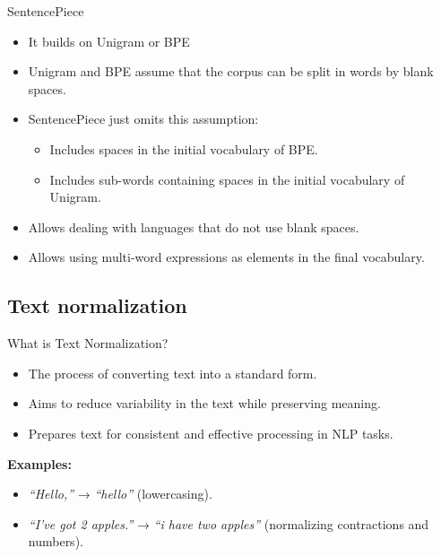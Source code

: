 \documentclass{beamer}
\begin{document}
\begin{frame}{SentencePiece}
    \begin{itemize}
      \item It builds on Unigram or BPE
      \item Unigram and BPE assume that the corpus can be split in words by blank spaces.
      \item SentencePiece just omits this assumption:
      \begin{itemize}
          \item Includes spaces in the initial vocabulary of BPE.
          \item Includes sub-words containing spaces in the initial vocabulary of Unigram.
      \end{itemize}
      \item Allows dealing with languages that do not use blank spaces.
      \item Allows using multi-word expressions as elements in the final vocabulary.
    \end{itemize}
\end{frame}
\subsection{Text normalization}


\begin{frame}{What is Text Normalization?}
    \begin{itemize}
        \item The process of converting text into a standard form.
        \item Aims to reduce variability in the text while preserving meaning.
        \item Prepares text for consistent and effective processing in NLP tasks.
    \end{itemize}
    \vspace{1em}
    \textbf{Examples:}
    \begin{itemize}
        \item \textit{“Hello,”} → \textit{“hello”} (lowercasing).
        \item \textit{“I’ve got 2 apples.”} → \textit{“i have two apples”} (normalizing contractions and numbers).
    \end{itemize}
\end{frame}
\end{document}
